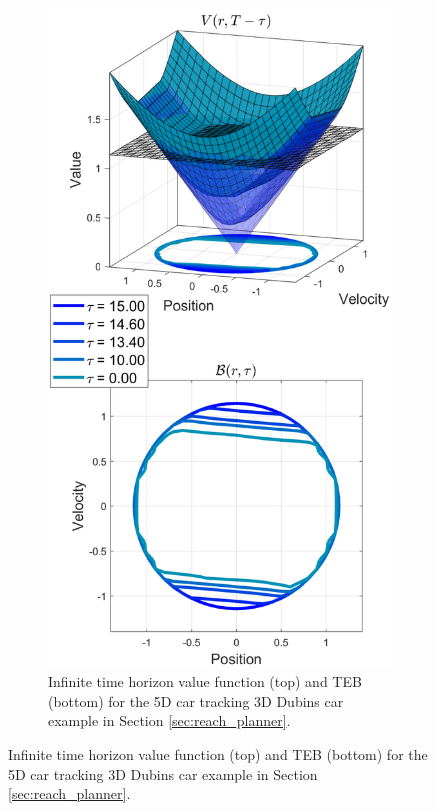 \begin{figure}
	\centering
  \begin{subfigure}[b]{0.48\columnwidth}
	\includegraphics[width=\columnwidth]{fig/tv_valfunc}
  \caption{\scriptsize Infinite time horizon value function (top) and TEB (bottom) for the 5D car tracking 3D Dubins car example in Section \ref{sec:reach_planner}.}

\end{subfigure}
\end{figure}
